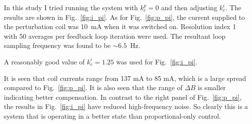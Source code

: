 

In this study I tried running the system with $k_c^p=0$ and then
adjusting $k_c^i$.  The results are shown in Fig.~\ref{fig:i_pi}.  As
for Fig.~\ref{fig:p_pi}, the current supplied to the perturbation coil
was 10~mA when it was switched on.  Resolution index 1 with 50
averages per feedback loop iteration were used.  The resultant loop
sampling frequency was found to be $\sim 6.5$~Hz.

A reasonably good value of $k_c^i=1.25$ was used for
Fig.~\ref{fig:i_pi}.

It is seen that coil currents range from 137 mA to 85 mA, which is a
large spread compared to Fig.~\ref{fig:p_pi}. It is also seen that the
range of $\Delta B$ is smaller indicating better compensation.  In
contrast to the right panel of Fig.~\ref{fig:p_pi}, the results in
Fig.~\ref{fig:i_pi} have reduced high-frequency noise.  So clearly
this is a system that is operating in a better state than
proportional-only control.

